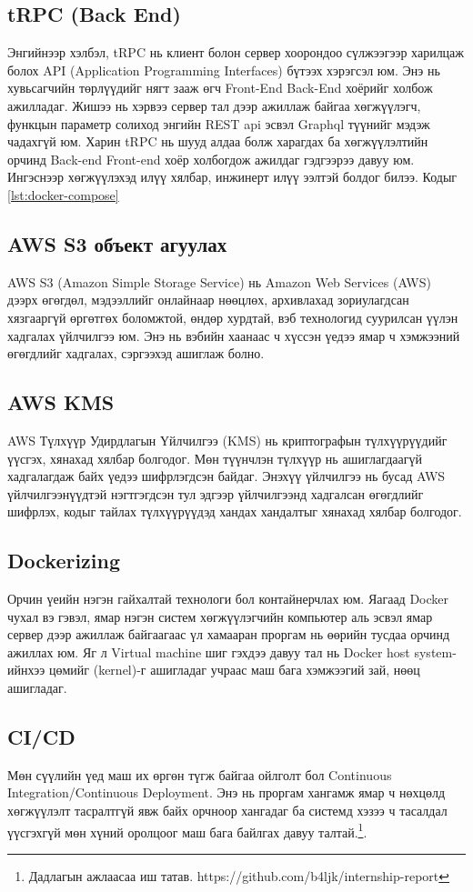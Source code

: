 \subsection{tRPC (Back End)}

Энгийнээр хэлбэл, tRPC нь клиент болон сервер хоорондоо сүлжээгээр харилцаж болох API (Application Programming Interfaces) бүтээх хэрэгсэл юм. Энэ нь хувьсагчийн төрлүүдийг нягт зааж өгч Front-End Back-End хоёрийг холбож ажилладаг. Жишээ нь хэрвээ сервер тал дээр ажиллаж байгаа хөгжүүлэгч, функцын параметр солиход энгийн REST api эсвэл Graphql түүнийг мэдэж чадахгүй юм. Харин tRPC нь шууд алдаа болж харагдах ба хөгжүүлэлтийн орчинд Back-end Front-end хоёр холбогдож ажилдаг гэдгээрээ давуу юм. Ингэснээр хөгжүүлэхэд илүү хялбар, инжинерт илүү ээлтэй болдог билээ.
Кодыг \ref{lst:docker-compose} 
\subsection{AWS S3 объект агуулах}
AWS S3 (Amazon Simple Storage Service) нь Amazon Web Services (AWS) дээрх өгөгдөл, мэдээллийг онлайнаар нөөцлөх, архивлахад зориулагдсан хязгааргүй өргөтгөх боломжтой, өндөр хурдтай, вэб технологид суурилсан үүлэн хадгалах үйлчилгээ юм. Энэ нь вэбийн хаанаас ч хүссэн үедээ ямар ч хэмжээний өгөгдлийг хадгалах, сэргээхэд ашиглаж болно.
\subsection{AWS KMS}
AWS Түлхүүр Удирдлагын Үйлчилгээ (KMS) нь криптографын түлхүүрүүдийг үүсгэх, хянахад хялбар болгодог. Мөн түүнчлэн түлхүүр нь ашиглагдаагүй хадгалагдаж байх үедээ шифрлэгдсэн байдаг.
Энэхүү үйлчилгээ нь бусад AWS үйлчилгээнүүдтэй нэгтгэгдсэн тул эдгээр үйлчилгээнд хадгалсан өгөгдлийг шифрлэх, кодыг тайлах түлхүүрүүдэд хандах хандалтыг хянахад хялбар болгодог.

\subsection{Dockerizing}
Орчин үеийн нэгэн гайхалтай технологи бол контайнерчлах юм. Яагаад Docker чухал вэ гэвэл, ямар нэгэн систем хөгжүүлэгчийн компьютер аль эсвэл ямар сервер дээр ажиллаж байгаагаас үл хамааран проргам нь өөрийн тусдаа орчинд ажиллах юм. Яг л Virtual machine шиг гэхдээ давуу тал нь Docker host system-ийнхээ цөмийг (kernel)-г ашигладаг учраас маш бага хэмжээгий зай, нөөц ашигладаг.
\subsection{CI/CD}
Мөн сүүлийн үед маш их өргөн түгж байгаа ойлголт бол Continuous Integration/Continuous Deployment.
Энэ нь проргам хангамж ямар ч нөхцөлд хөгжүүлэлт тасралтгүй явж байх орчноор хангадаг ба системд хэзээ ч тасалдал үүсгэхгүй мөн хүний оролцоог маш бага байлгах давуу талтай.\footnote{Дадлагын ажлаасаа иш татав. https://github.com/b4ljk/internship-report}.

